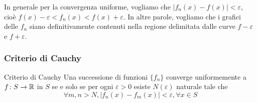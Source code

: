 \documentclass[a4paper]{article}
\begin{document}
\begin{radioactive}
    In generale per la convergenza uniforme, vogliamo che \(|f_n(x) - f(x)| < \varepsilon\),
    cioè \(f(x)-\varepsilon < f_n(x) < f(x)+\varepsilon\).
    In altre parole, vogliamo che i grafici delle \(f_n\) siano definitivamente contenuti
    nella regione delimitata dalle curve \(f-\varepsilon\) e \(f + \varepsilon\).
\end{radioactive}

\subsubsection{Criterio di Cauchy}

\begin{radioactive}
    \begin{snippettheorem}{Criterio di Cauchy}
        Una successione di funzioni \(\{f_n\}\) converge uniformemente a \(f \colon S \to \mathbb{R}\)
        in \(S\) se e solo se per ogni \(\varepsilon > 0\) esiste \(N(\varepsilon)\) naturale tale che
        \[
            \forall m,n > N,
            |f_n(x) - f_m(x)| < \varepsilon, \forall x \in S
        \]
    \end{snippettheorem}
\end{radioactive}
\end{document}
